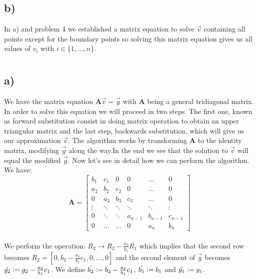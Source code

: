 \documentclass[a4paper,10pt,english]{article}
\begin{document}
			\subsection{b)}
			In a) and problem 4 we established a matrix equation to solve $\vec{v}$ containing all points except for the boundary points so solving this matrix equation gives us all values of $v_i$ with $i \in \{1, \dots, n\}$.
			
			
			
			\section{} %
			\subsection{a)}
			We have the matrix equation $\boldsymbol{A}\vec{v} = \vec{g}$ with
			$\boldsymbol{A}$ being a general tridiagonal matrix. In order to solve this
			equation we will proceed in two steps. The first one, known as forward
			substitution consist in doing matrix operation to obtain an upper triangular
			matrix and the last step, backwards substitution, which will give us our
			approximation $\vec{v}$.
			The algorithm works by transforming  $\boldsymbol{A}$ to the identity matrix,
			modifying $\vec{g}$ along the way.In the end we see that the solution to
			$\vec{v}$ will equal the modified $\vec{g}$. Now let's see in detail how we can
			perform the algorithm. \\
			
			We have: \[
			\boldsymbol{A} = \begin{bmatrix}
				b_1 & c_1 & 0 & 0 & \dots & 0 \\
				a_2 & b_2 & c_2 & 0 & \dots & 0\\
				0 & a_3 & b_3 & c_3 & \dots & 0\\
				\vdots & \ddots &  \ddots & \ddots & \ddots & \vdots \\
				0 & \ddots &  \ddots & a_{n-1} & b_{n-1} & c_{n-1} \\
				0 & \dots &  \dots & 0 & a_{n} & b_{n}
			\end{bmatrix}
			\]
			\\
			
			We perform the operation: $R_2 \rightarrow R_2 - \frac{a_2}{b_1}R_1$ which
			implies that the second row becomes
			$R_2 = [0, b_2 - \frac{a_2}{b_1}c_1, 0, \dots, 0]$ and the second element of
			$\vec{g}$ becomes $\Tilde{g_2} := g_2 - \frac{a_2}{b_1}c_1$. We define
			$\Tilde{b_2}:= b_2 - \frac{a_2}{b_1}c_1$, $\Tilde{b_1}:= b_1$ and
			$\Tilde{g_1} := g_1$. \\
			
\end{document}
